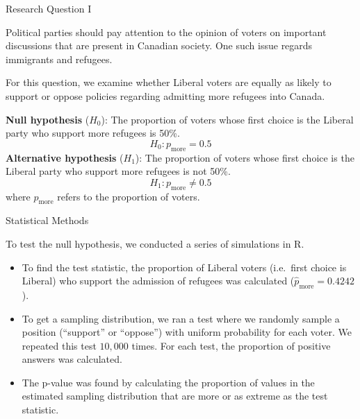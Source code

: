 \documentclass[
  ignorenonframetext,
]{beamer}
\providecommand{\tightlist}{%
  \setlength{\itemsep}{0pt}\setlength{\parskip}{0pt}}
\begin{document}
\begin{frame}{Research Question I}
\protect\hypertarget{research-question-i}{}

Political parties should pay attention to the opinion of voters on
important discussions that are present in Canadian society. One such
issue regards immigrants and refugees.

For this question, we examine whether Liberal voters are equally as
likely to support or oppose policies regarding admitting more refugees
into Canada.

\textbf{Null hypothesis} (\(H_0\)): The proportion of voters whose first
choice is the Liberal party who support more refugees is 50\%.
\[H_0: p_\text{more} = 0.5\] \textbf{Alternative hypothesis} (\(H_1\)):
The proportion of voters whose first choice is the Liberal party who
support more refugees is not 50\%. \[H_1: p_\text{more} \neq 0.5\] where
\(p_\text{more}\) refers to the proportion of voters.

\end{frame}

\begin{frame}{Statistical Methods}
\protect\hypertarget{statistical-methods}{}

To test the null hypothesis, we conducted a series of simulations in R.

\begin{itemize}
\tightlist
\item
  To find the test statistic, the proportion of Liberal voters
  (i.e.~first choice is Liberal) who support the admission of refugees
  was calculated (\(\hat{p}_\text{more}=0.4242\)).
\item
  To get a sampling distribution, we ran a test where we randomly sample
  a position (``support'' or ``oppose'') with uniform probability for
  each voter. We repeated this test \(10,000\) times. For each test, the
  proportion of positive answers was calculated.
\item
  The p-value was found by calculating the proportion of values in the
  estimated sampling distribution that are more or as extreme as the
  test statistic.
\end{itemize}

\end{frame}
\end{document}
